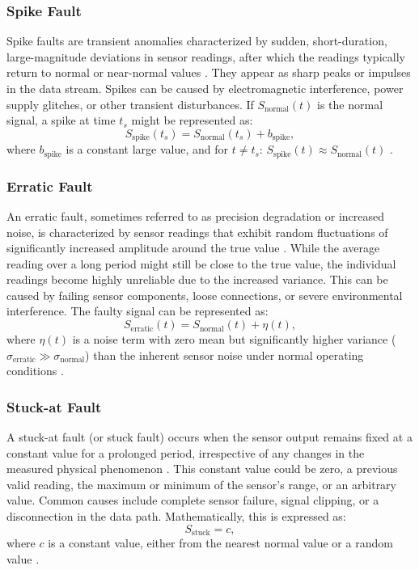 \subsubsection{Spike Fault}
Spike faults are transient anomalies characterized by sudden, short-duration, large-magnitude deviations in sensor readings, after which the readings typically return to normal or near-normal values \cite{Saeed2021, Shi2024}. They appear as sharp peaks or impulses in the data stream. Spikes can be caused by electromagnetic interference, power supply glitches, or other transient disturbances. If \(S_\text{normal}(t)\) is the normal signal, a spike at time \(t_s\) might be represented as:
\begin{equation}
S_\text{spike}(t_s) = S_\text{normal}(t_s) + b_\text{spike},
\label{eq:spike}
\end{equation}
where \(b_\text{spike}\) is a constant large value, and for \(t \neq t_s\): \(S_\text{spike}(t) \approx S_\text{normal}(t)\) \cite{Saeed2021, Shi2024}.

\subsubsection{Erratic Fault}
An erratic fault, sometimes referred to as precision degradation or increased noise, is characterized by sensor readings that exhibit random fluctuations of significantly increased amplitude around the true value \cite{Saeed2021}. While the average reading over a long period might still be close to the true value, the individual readings become highly unreliable due to the increased variance. This can be caused by failing sensor components, loose connections, or severe environmental interference. The faulty signal can be represented as:
\begin{equation}
S_\text{erratic}(t) = S_\text{normal}(t) + \eta(t),
\label{eq:erratic}
\end{equation}
where \(\eta(t)\) is a noise term with zero mean but significantly higher variance (\(\sigma_\text{erratic} \gg \sigma_\text{normal}\)) than the inherent sensor noise under normal operating conditions \cite{Saeed2021}.

\subsubsection{Stuck-at Fault}
A stuck-at fault (or stuck fault) occurs when the sensor output remains fixed at a constant value for a prolonged period, irrespective of any changes in the measured physical phenomenon \cite{Saeed2021, Hasan2024, Shi2024}. This constant value could be zero, a previous valid reading, the maximum or minimum of the sensor's range, or an arbitrary value. Common causes include complete sensor failure, signal clipping, or a disconnection in the data path. Mathematically, this is expressed as:
\begin{equation}
S_\text{stuck} = c,
\label{eq:stuck}
\end{equation}
where \(c\) is a constant value, either from the nearest normal value or a random value \cite{Saeed2021, Hasan2024, Shi2024}.

